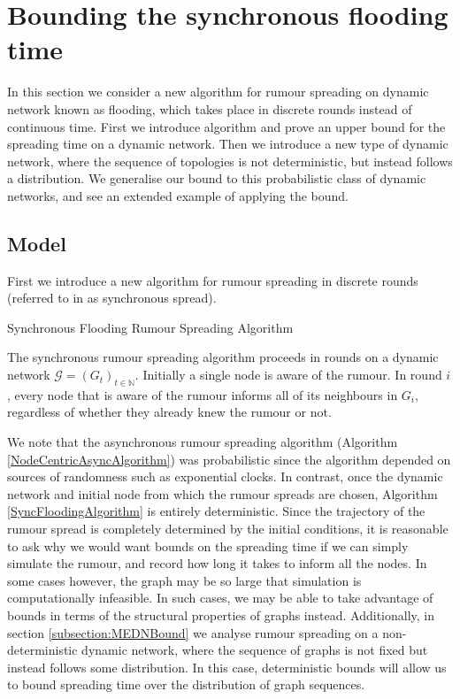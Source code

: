 \section{Bounding the synchronous flooding time}
\label{SyncFloodingSection}

In this section we consider a new algorithm for rumour spreading on dynamic network known as flooding, which takes place in discrete rounds instead of continuous time. First we introduce algorithm and prove an upper bound for the spreading time on a dynamic network. Then we introduce a new type of dynamic network, where the sequence of topologies is not deterministic, but instead follows a distribution. We generalise our bound to this probabilistic class of dynamic networks, and see an extended example of applying the bound.

\subsection{Model}

First we introduce a new algorithm for rumour spreading in discrete rounds (referred to in 
as synchronous spread).

\begin{definition} \label{SyncFloodingAlgorithm}
	Synchronous Flooding Rumour Spreading Algorithm

	\noindent
	The synchronous rumour spreading algorithm proceeds in rounds on a dynamic network $\mathcal{G} = (G_t)_{t \in \mathbb{N}}$. Initially a single node is aware of the rumour. In round $i$, every node that is aware of the rumour informs all of its neighbours in $G_i$, regardless of whether they already knew the rumour or not.
\end{definition}

We note that the asynchronous rumour spreading algorithm (Algorithm \ref{NodeCentricAsyncAlgorithm}) was probabilistic since the algorithm depended on sources of randomness such as exponential clocks. In contrast, once the dynamic network and initial node from which the rumour spreads are chosen, Algorithm \ref{SyncFloodingAlgorithm} is entirely deterministic. Since the trajectory of the rumour spread is completely determined by the initial conditions, it is reasonable to ask why we would want bounds on the spreading time if we can simply simulate the rumour, and record how long it takes to inform all the nodes. In some cases however, the graph may be so large that simulation is computationally infeasible. 
In such cases, we may be able to take advantage of bounds in terms of the structural properties of graphs instead. %
Additionally, in section \ref{subsection:MEDNBound}
we analyse rumour spreading on a non-deterministic dynamic network, where the sequence of graphs is not fixed but instead follows some distribution. 
In this case, deterministic bounds will allow us to bound spreading time over the distribution of graph sequences. %

